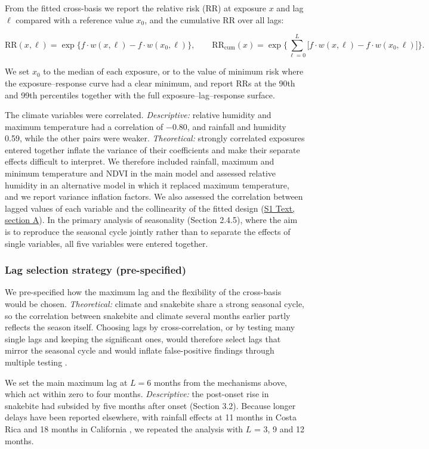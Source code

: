 \documentclass[11pt,a4paper]{article}
\begin{document}
From the fitted cross-basis we report the relative risk (RR) at exposure \(x\) and lag \(\ell\) compared with a reference value \(x_0\), and the cumulative RR over all lags:

\[\mathrm{RR}(x,\ell) = \exp\lbrace f\cdot w(x,\ell) - f\cdot w(x_0,\ell)\rbrace, \qquad \mathrm{RR}_{\text{cum}}(x) = \exp\Big\lbrace \sum_{\ell=0}^{L} \big[f\cdot w(x,\ell) - f\cdot w(x_0,\ell)\big]\Big\rbrace.\]

We set \(x_0\) to the median of each exposure, or to the value of minimum risk where the exposure--response curve had a clear minimum, and report RRs at the 90th and 99th percentiles together with the full exposure--lag--response surface.

The climate variables were correlated. \emph{Descriptive:} relative humidity and maximum temperature had a correlation of −0.80, and rainfall and humidity 0.59, while the other pairs were weaker. \emph{Theoretical:} strongly correlated exposures entered together inflate the variance of their coefficients and make their separate effects difficult to interpret. We therefore included rainfall, maximum and minimum temperature and NDVI in the main model and assessed relative humidity in an alternative model in which it replaced maximum temperature, and we report variance inflation factors. We also assessed the correlation between lagged values of each variable and the collinearity of the fitted design (\hyperref[s1text-a]{S1 Text, section A}). In the primary analysis of seasonality (Section 2.4.5), where the aim is to reproduce the seasonal cycle jointly rather than to separate the effects of single variables, all five variables were entered together.

\subsubsection{Lag selection strategy (pre-specified)}

We pre-specified how the maximum lag and the flexibility of the cross-basis would be chosen. \emph{Theoretical:} climate and snakebite share a strong seasonal cycle, so the correlation between snakebite and climate several months earlier partly reflects the season itself. Choosing lags by cross-correlation, or by testing many single lags and keeping the significant ones, would therefore select lags that mirror the seasonal cycle and would inflate false-positive findings through multiple testing \cite{ref30}.

We set the main maximum lag at \(L = 6\) months from the mechanisms above, which act within zero to four months. \emph{Descriptive:} the post-onset rise in snakebite had subsided by five months after onset (Section 3.2). Because longer delays have been reported elsewhere, with rainfall effects at 11 months in Costa Rica \cite{ref9} and 18 months in California \cite{ref10}, we repeated the analysis with \(L\) = 3, 9 and 12 months.
\end{document}
